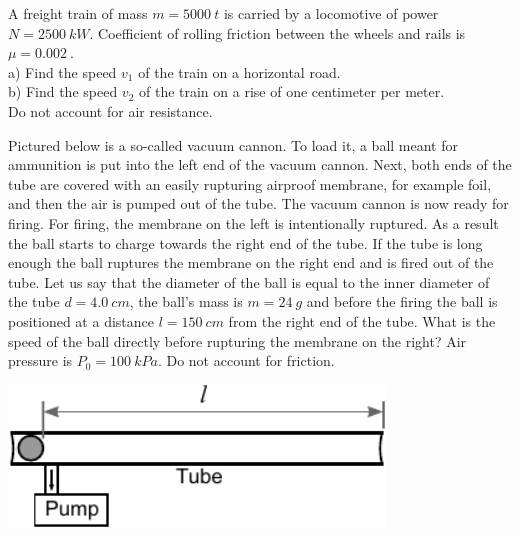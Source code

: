\documentclass[11pt]{article}
\begin{document}

\probeng
A freight train of mass $m=\SI{5000}{t}$ is carried by a locomotive of power $N=\SI{2500}{kW}$. Coefficient of rolling friction between the wheels and rails is $\mu=\SI{0,002}{}$.\\
a) Find the speed $v_1$ of the train on a horizontal road.\\
b) Find the speed $v_2$ of the train on a rise of one centimeter per meter.\\
Do not account for air resistance.
\probend
\bigskip


\probeng
Pictured below is a so-called vacuum cannon. To load it, a ball meant for ammunition is put into the left end of the vacuum cannon. Next, both ends of the tube are covered with an easily rupturing airproof membrane, for example foil, and then the air is pumped out of the tube. The vacuum cannon is now ready for firing. For firing, the membrane on the left is intentionally ruptured. As a result the ball starts to charge towards the right end of the tube. If the tube is long enough the ball ruptures the membrane on the right end and is fired out of the tube. Let us say that the diameter of the ball is equal to the inner diameter of the tube $d=\SI{4,0}{cm}$, the ball’s mass is $m=\SI{24}{g}$ and before the firing the ball is positioned at a distance $l=\SI{150}{cm}$ from the right end of the tube. What is the speed of the ball directly before rupturing the membrane on the right? Air pressure is $P_0=\SI{100}{kPa}$. Do not account for friction.
\begin{center}
  \includegraphics[width=0.75\textwidth]{2014-lahg-02-vaakumkahur_ing}
\end{center}
\probend
\bigskip

\end{document}
